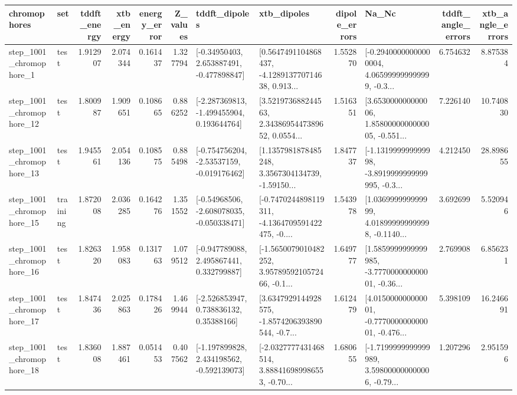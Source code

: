 \begin{tabular}{llrrrrllrlrr}
\toprule
             chromophores &       set &  tddft\_energy &  xtb\_energy &  energy\_error &  Z\_values &                               tddft\_dipoles &                                        xtb\_dipoles &  dipole\_errors &                                              Na\_Nc &  tddft\_angle\_errors &  xtb\_angle\_errors \\
\midrule
  step\_1001\_chromophore\_1 &      test &      1.912907 &    2.074344 &      0.161437 &  1.327794 &    [-0.34950403, 2.653887491, -0.477898847] &  [0.5647491104868437, -4.128913770714638, 0.913... &       1.552870 &  [-0.29400000000000004, 4.065999999999999, -0.3... &            6.754632 &          8.875384 \\
 step\_1001\_chromophore\_12 &      test &      1.800987 &    1.909651 &      0.108665 &  0.886252 &   [-2.287369813, -1.499455904, 0.193644764] &  [3.521973688244563, 2.3438695447389652, 0.0554... &       1.516351 &  [3.653000000000006, 1.8580000000000005, -0.551... &            7.226140 &         10.740830 \\
 step\_1001\_chromophore\_13 &      test &      1.945561 &    2.054136 &      0.108575 &  0.885498 &   [-0.754756204, -2.53537159, -0.019176462] &  [1.1357981878485248, 3.3567304134739, -1.59150... &       1.847737 &  [-1.131999999999998, -3.8919999999999995, -0.3... &            4.212450 &         28.898655 \\
 step\_1001\_chromophore\_15 &  training &      1.872008 &    2.036285 &      0.164276 &  1.351552 &   [-0.54968506, -2.608078035, -0.050338471] &  [-0.7470244898119311, -4.1364709591422475, -0.... &       1.543978 &  [1.036999999999999, 4.018999999999998, -0.1140... &            3.692699 &          5.520946 \\
 step\_1001\_chromophore\_16 &      test &      1.826320 &    1.958083 &      0.131763 &  1.079512 &    [-0.947789088, 2.495867441, 0.332799887] &  [-1.5650079010482252, 3.9578959210572466, -0.1... &       1.649777 &  [1.5859999999999985, -3.777000000000001, -0.36... &            2.769908 &          6.856231 \\
 step\_1001\_chromophore\_17 &      test &      1.847436 &    2.025863 &      0.178426 &  1.469944 &     [-2.526853947, 0.738836132, 0.35388166] &  [3.6347929144928575, -1.8574206393890544, -0.7... &       1.612479 &  [4.015000000000001, -0.777000000000001, -0.476... &            5.398109 &         16.246691 \\
 step\_1001\_chromophore\_18 &      test &      1.836008 &    1.887461 &      0.051453 &  0.407562 &   [-1.197899828, 2.434198562, -0.592139073] &  [-2.0327777431468514, 3.888416989986553, -0.70... &       1.680655 &  [-1.7199999999999989, 3.598000000000006, -0.79... &            1.207296 &          2.951596 \\

\end{tabular}
